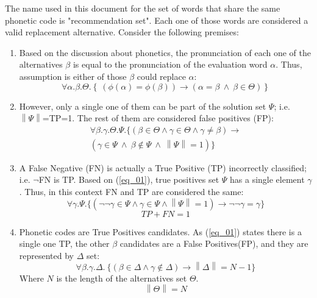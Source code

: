 \documentclass[9pt,conference]{IEEEtran}
\begin{document}
The name used in this document for the set of words that share the same phonetic code is 
"recommendation set". Each one of those words are considered a valid replacement alternative. 
Consider the following premises:
\begin{enumerate}
\item Based on the discussion about phonetics, the pronunciation of each one of the alternatives $\beta$
is equal to the pronunciation of the evaluation word $\alpha$. Thus, assumption is either of those $\beta$
could replace $\alpha$:
\begin{equation}
\forall\alpha.\beta.\Theta.\left\{\ (\phi(\alpha) = \phi(\beta)) \to (\alpha=\beta\ \land\ \beta\in\Theta)\right\}
\end{equation}

\item However, only a single one of them can be part of the solution set $\Psi$; i.e. $\left\|\Psi\right\|$=TP=1. The rest of them are considered
false positives (FP):
\begin{multline}
\label{eq_01}
\forall\beta.\gamma.\Theta.\Psi.\{(\beta\in\Theta\land\gamma\in\Theta\land \gamma\ne\beta) \to\\ (\gamma\in\Psi\ \land\ \beta\notin\Psi\ \land\ \left\|\Psi\right\|=1)\}
\end{multline}

\item A False Negative (FN) is actually a True Positive (TP) incorrectly classified; i.e. $\neg$FN is TP. Based on (\ref{eq_01}), true positives set $\Psi$ has a single element $\gamma$. Thus, in this context FN and TP are considered the same:
\begin{equation}
\forall\gamma.\Psi.\{(\neg\neg\gamma\in\Psi\land\gamma\in\Psi\land\left\|\Psi\right\|=1)\to\neg\neg\gamma=\gamma\}
\end{equation}
\begin{equation}
TP+FN=1
\end{equation}

\item Phonetic codes are True Positives candidates. As (\ref{eq_01}) states there is a single one 
TP, the other $\beta$ candidates are a False Positives(FP), and they are represented by 
$\Delta$ set:
\begin{equation}
\label{eq_02}
\forall\beta.\gamma.\Delta.\ \{(\beta\in\Delta\land\gamma\notin\Delta) \to\left\|\Delta\right\|=N-1\}
\end{equation}
Where $N$ is the length of the alternatives set $\Theta$.
\begin{equation}
\left\|\Theta\right\|=N
\end{equation}


\end{enumerate}
\end{document}
